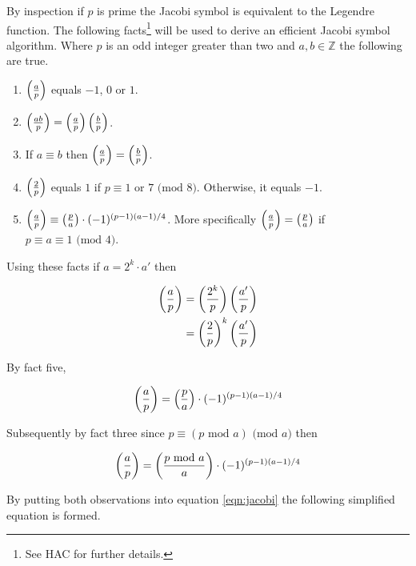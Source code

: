 \documentclass[b5paper]{book}
\def\Z{{\mathbb Z}}
\begin{document}
By inspection if $p$ is prime the Jacobi symbol is equivalent to the Legendre function.  The following facts\footnote{See HAC \cite[pp. 72-74]{HAC} for
further details.} will be used to derive an efficient Jacobi symbol algorithm.  Where $p$ is an odd integer greater than two and $a, b \in \Z$ the
following are true.  

\begin{enumerate}
\item $\left ( { a \over p} \right )$ equals $-1$, $0$ or $1$. 
\item $\left ( { ab \over p} \right ) = \left ( { a \over p} \right )\left ( { b \over p} \right )$.
\item If $a \equiv b$ then $\left ( { a \over p} \right ) = \left ( { b \over p} \right )$.
\item $\left ( { 2 \over p} \right )$ equals $1$ if $p \equiv 1$ or $7 \mbox{ (mod }8\mbox{)}$.  Otherwise, it equals $-1$.
\item $\left ( { a \over p} \right ) \equiv \left ( { p \over a} \right ) \cdot (-1)^{(p-1)(a-1)/4}$.  More specifically 
$\left ( { a \over p} \right ) = \left ( { p \over a} \right )$ if $p \equiv a \equiv 1 \mbox{ (mod }4\mbox{)}$.  
\end{enumerate}

Using these facts if $a = 2^k \cdot a'$ then

\begin{eqnarray}
\left ( { a \over p } \right ) = \left ( {{2^k} \over p } \right ) \left ( {a' \over p} \right ) \nonumber \\
                               = \left ( {2 \over p } \right )^k \left ( {a' \over p} \right ) 
\label{eqn:jacobi}
\end{eqnarray}

By fact five, 

\begin{equation}
\left ( { a \over p } \right ) = \left ( { p \over a } \right ) \cdot (-1)^{(p-1)(a-1)/4} 
\end{equation}

Subsequently by fact three since $p \equiv (p \mbox{ mod }a) \mbox{ (mod }a\mbox{)}$ then 

\begin{equation}
\left ( { a \over p } \right ) = \left ( { {p \mbox{ mod } a} \over a } \right ) \cdot (-1)^{(p-1)(a-1)/4} 
\end{equation}

By putting both observations into equation \ref{eqn:jacobi} the following simplified equation is formed.
\end{document}
